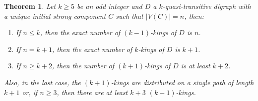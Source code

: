\documentclass[preprint]{elsarticle}
\newtheorem{thm}{Theorem}[section]
\begin{document}
\begin{thm}
Let $k \ge 5$ be an odd integer and $D$ a $k$-quasi-transitive digraph with a unique initial strong component $C$ such that $|V(C)|=n$, then:
\begin{enumerate}
	\item If $n \le k$, then the exact number of $(k-1)$-kings of $D$ is $n$.
	
	\item If $n = k+1$, then the exact number of $k$-kings of $D$ is $k+1$.
	
	\item If $n \ge k+2$, then the number of $(k+1)$-kings of $D$ is at least $k+2$.
\end{enumerate}

\noindent
Also, in the last case, the $(k+1)$-kings are distributed on a single path of length $k+1$ or, if $n \ge 3$, then there are at least $k+3$ $(k+1)$-kings.
\end{thm}
\end{document}
